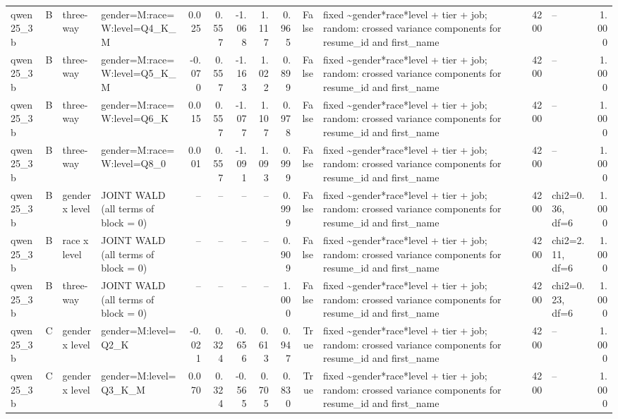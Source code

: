 \begin{tabular}{llllrrrrrrlrlr}
qwen25\_3b & B & three-way & gender=M:race=W:level=Q4\_K\_M & 0.025 & 0.557 & -1.068 & 1.117 & 0.965 & False & fixed \textasciitilde \space gender*race*level + tier + job; random: crossed variance components for resume\_id and first\_name & 4200 & -- & 1.000 \\
qwen25\_3b & B & three-way & gender=M:race=W:level=Q5\_K\_M & -0.070 & 0.557 & -1.163 & 1.022 & 0.899 & False & fixed \textasciitilde \space gender*race*level + tier + job; random: crossed variance components for resume\_id and first\_name & 4200 & -- & 1.000 \\
qwen25\_3b & B & three-way & gender=M:race=W:level=Q6\_K & 0.015 & 0.557 & -1.077 & 1.107 & 0.978 & False & fixed \textasciitilde \space gender*race*level + tier + job; random: crossed variance components for resume\_id and first\_name & 4200 & -- & 1.000 \\
qwen25\_3b & B & three-way & gender=M:race=W:level=Q8\_0 & 0.001 & 0.557 & -1.091 & 1.093 & 0.999 & False & fixed \textasciitilde \space gender*race*level + tier + job; random: crossed variance components for resume\_id and first\_name & 4200 & -- & 1.000 \\
qwen25\_3b & B & gender x level & JOINT WALD (all terms of block = 0) & -- & -- & -- & -- & 0.999 & False & fixed \textasciitilde \space gender*race*level + tier + job; random: crossed variance components for resume\_id and first\_name & 4200 & chi2=0.36, df=6 & 1.000 \\
qwen25\_3b & B & race x level & JOINT WALD (all terms of block = 0) & -- & -- & -- & -- & 0.909 & False & fixed \textasciitilde \space gender*race*level + tier + job; random: crossed variance components for resume\_id and first\_name & 4200 & chi2=2.11, df=6 & 1.000 \\
qwen25\_3b & B & three-way & JOINT WALD (all terms of block = 0) & -- & -- & -- & -- & 1.000 & False & fixed \textasciitilde \space gender*race*level + tier + job; random: crossed variance components for resume\_id and first\_name & 4200 & chi2=0.23, df=6 & 1.000 \\
qwen25\_3b & C & gender x level & gender=M:level=Q2\_K & -0.021 & 0.324 & -0.656 & 0.613 & 0.947 & True & fixed \textasciitilde \space gender*race*level + tier + job; random: crossed variance components for resume\_id and first\_name & 4200 & -- & 1.000 \\
qwen25\_3b & C & gender x level & gender=M:level=Q3\_K\_M & 0.070 & 0.324 & -0.565 & 0.705 & 0.830 & True & fixed \textasciitilde \space gender*race*level + tier + job; random: crossed variance components for resume\_id and first\_name & 4200 & -- & 1.000 \\

\end{tabular}
